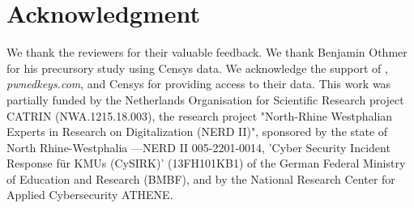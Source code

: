 \section*{Acknowledgment}
\label{sec:acknowledgment}
We thank the reviewers for their valuable feedback.
We thank Benjamin Othmer for his precursory study using Censys data.
We acknowledge the support of \iptwolocation, \textit{pwnedkeys.com}, and Censys for providing  access to their data.
This work was partially funded by the Netherlands Organisation for Scientific Research project CATRIN (NWA.1215.18.003), the research project "North-Rhine Westphalian Experts in Research on Digitalization (NERD II)",
sponsored by the state of North Rhine-Westphalia ---NERD II 005-2201-0014, 'Cyber Security Incident Response für KMUs (CySIRK)' (13FH101KB1) of the German Federal Ministry of Education and Research (BMBF), and by the National Research Center for Applied Cybersecurity ATHENE. 
